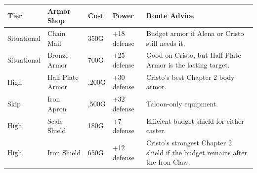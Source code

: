 \documentclass[
  american,
  10pt,
  letterpaper,
  oneside,
  open=any]{scrreprt}
\newcounter{none} %
\newenvironment{guidetable}{%
  \small\setstretch{1.0}%
  \setlength{\tabcolsep}{4pt}%
  \setlength{\LTpre}{8pt}\setlength{\LTpost}{10pt}%
  \renewcommand{\arraystretch}{1.16}%
}{ }
\begin{document}
\begin{guidetable}

{\def\LTcaptype{none} %
\begin{longtable}[]{@{}
  >{\raggedright\arraybackslash}p{}
  >{\raggedright\arraybackslash}p{}
  >{\raggedleft\arraybackslash}p{}
  >{\raggedleft\arraybackslash}p{}
  >{\raggedright\arraybackslash}p{}@{}}
\toprule\noalign{}
\begin{minipage}[b]{\linewidth}\raggedright
\color{GuideGreen}\bfseries Tier
\end{minipage} & \begin{minipage}[b]{\linewidth}\raggedright
\color{GuideGreen}\bfseries Armor Shop
\end{minipage} & \begin{minipage}[b]{\linewidth}\raggedleft
\color{GuideGreen}\bfseries Cost
\end{minipage} & \begin{minipage}[b]{\linewidth}\raggedleft
\color{GuideGreen}\bfseries Power
\end{minipage} & \begin{minipage}[b]{\linewidth}\raggedright
\color{GuideGreen}\bfseries Route Advice
\end{minipage} \\
\midrule\noalign{}
\endhead
\bottomrule\noalign{}
\endlastfoot
Situational & Chain Mail & 350G & +18 defense & Budget armor if Alena or
Cristo still needs it. \\
Situational & Bronze Armor & 700G & +25 defense & Good on Cristo, but
Half Plate Armor is the lasting target. \\
High & Half Plate Armor & 1,200G & +30 defense & Cristo's best Chapter 2
body armor. \\
Skip & Iron Apron & 1,500G & +32 defense & Taloon-only equipment. \\
High & Scale Shield & 180G & +7 defense & Efficient budget shield for
either caster. \\
High & Iron Shield & 650G & +12 defense & Cristo's strongest Chapter 2
shield if the budget remains after the Iron Claw. \\
\end{longtable}
}

\end{guidetable}
\end{document}
